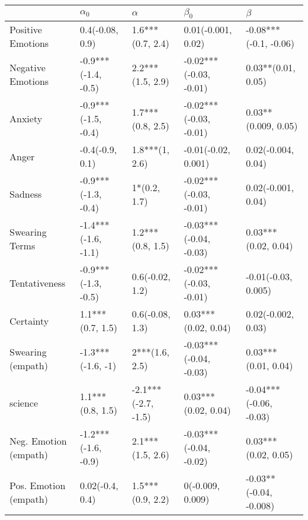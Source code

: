 \begin{tabular}{lllll}
\toprule
{} &           $\alpha_0$ &             $\alpha$ &               $\beta_0$ &                 $\beta$ \\
\midrule
Positive Emotions     &      0.4(-0.08, 0.9) &     1.6***(0.7, 2.4) &      0.01(-0.001, 0.02) &   -0.08***(-0.1, -0.06) \\
Negative Emotions     &  -0.9***(-1.4, -0.5) &     2.2***(1.5, 2.9) &  -0.02***(-0.03, -0.01) &      0.03**(0.01, 0.05) \\
Anxiety               &  -0.9***(-1.5, -0.4) &     1.7***(0.8, 2.5) &  -0.02***(-0.03, -0.01) &     0.03**(0.009, 0.05) \\
Anger                 &      -0.4(-0.9, 0.1) &       1.8***(1, 2.6) &     -0.01(-0.02, 0.001) &      0.02(-0.004, 0.04) \\
Sadness               &  -0.9***(-1.3, -0.4) &         1*(0.2, 1.7) &  -0.02***(-0.03, -0.01) &      0.02(-0.001, 0.04) \\
Swearing Terms        &  -1.4***(-1.6, -1.1) &     1.2***(0.8, 1.5) &  -0.03***(-0.04, -0.03) &     0.03***(0.02, 0.04) \\
Tentativeness         &  -0.9***(-1.3, -0.5) &      0.6(-0.02, 1.2) &  -0.02***(-0.03, -0.01) &     -0.01(-0.03, 0.005) \\
Certainty             &     1.1***(0.7, 1.5) &      0.6(-0.08, 1.3) &     0.03***(0.02, 0.04) &      0.02(-0.002, 0.03) \\
Swearing (empath)     &    -1.3***(-1.6, -1) &       2***(1.6, 2.5) &  -0.03***(-0.04, -0.03) &     0.03***(0.01, 0.04) \\
science               &     1.1***(0.8, 1.5) &  -2.1***(-2.7, -1.5) &     0.03***(0.02, 0.04) &  -0.04***(-0.06, -0.03) \\
Neg. Emotion (empath) &  -1.2***(-1.6, -0.9) &     2.1***(1.5, 2.6) &  -0.03***(-0.04, -0.02) &     0.03***(0.02, 0.05) \\
Pos. Emotion (empath) &      0.02(-0.4, 0.4) &     1.5***(0.9, 2.2) &        0(-0.009, 0.009) &  -0.03**(-0.04, -0.008) \\
\bottomrule
\end{tabular}
